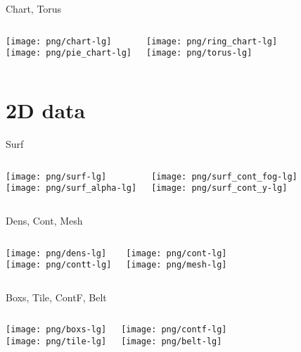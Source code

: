 \documentclass[color=usenames]{beamer}
\begin{document}
\begin{frame}{Chart, Torus}
\begin{columns}
\texttt{[image: png/chart-lg]}\\
\texttt{[image: png/pie\_chart-lg]}

\texttt{[image: png/ring\_chart-lg]}\\
\texttt{[image: png/torus-lg]}

\end{columns}
\end{frame}


\section{2D data}

\begin{frame}{Surf}
\begin{columns}
\texttt{[image: png/surf-lg]}\\
\texttt{[image: png/surf\_alpha-lg]}

\texttt{[image: png/surf\_cont\_fog-lg]}\\
\texttt{[image: png/surf\_cont\_y-lg]}

\end{columns}
\end{frame}

\begin{frame}{Dens, Cont, Mesh}
\begin{columns}
\texttt{[image: png/dens-lg]}\\
\texttt{[image: png/contt-lg]}

\texttt{[image: png/cont-lg]}\\
\texttt{[image: png/mesh-lg]}

\end{columns}
\end{frame}

\begin{frame}{Boxs, Tile, ContF, Belt}
\begin{columns}
\texttt{[image: png/boxs-lg]}\\
\texttt{[image: png/tile-lg]}

\texttt{[image: png/contf-lg]}\\
\texttt{[image: png/belt-lg]}

\end{columns}
\end{frame}
\end{document}
